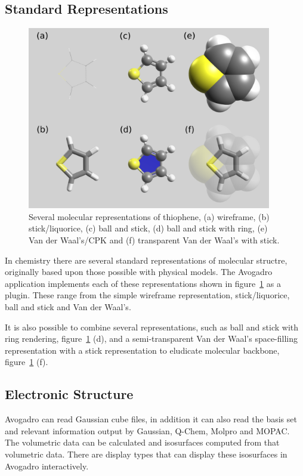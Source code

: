 \documentclass{article}
\begin{document}
\subsection{Standard Representations}

\begin{figure}
	\includegraphics[width=0.95\textwidth]{images/standardRepsLabel}
	\caption{Several molecular representations of thiophene, (a) wireframe, (b) stick/liquorice, (c) ball and stick, (d) ball and stick with ring, (e) Van der Waal's/CPK and (f) transparent Van der Waal's with stick.}
	\label{f:standardReps}
\end{figure}

In chemistry there are several standard representations of molecular structre, originally based upon those possible with physical models. The Avogadro application implements each of these representations shown in figure~\ref{f:standardReps} as a plugin. These range from the simple wireframe representation, stick/liquorice, ball and stick and Van der Waal's.

It is also possible to combine several representations, such as ball and stick with ring rendering, figure~\ref{f:standardReps} (d), and a semi-transparent Van der Waal's space-filling representation with a stick representation to eludicate molecular backbone, figure~\ref{f:standardReps} (f).

\subsection{Electronic Structure}

Avogadro can read Gaussian cube files, in addition it can also read the basis set and relevant information output by Gaussian, Q-Chem, Molpro and MOPAC. The volumetric data can be calculated and isosurfaces computed from that volumetric data. There are display types that can display these isosurfaces in Avogadro interactively.
\end{document}
